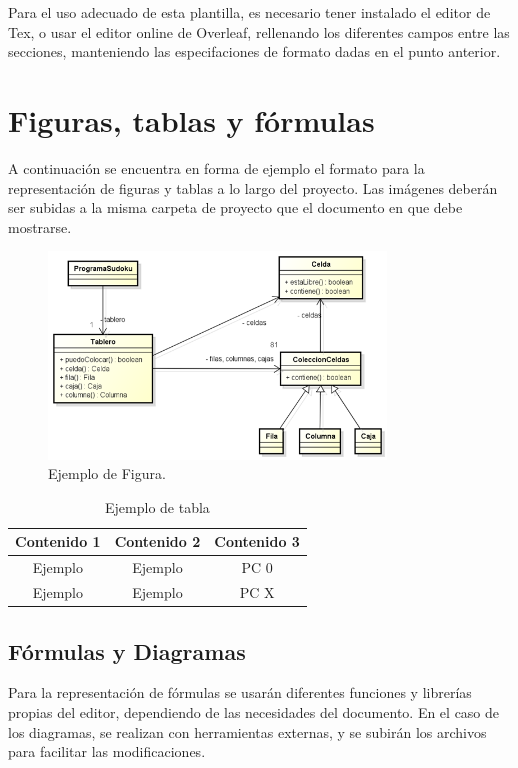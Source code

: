 \documentclass[titlepage,a4paper]{article}
\begin{document}
Para el uso adecuado de esta plantilla, es necesario tener instalado el editor de Tex, o usar el editor online de Overleaf, rellenando los diferentes campos entre las secciones, manteniendo las especifaciones de formato dadas en el punto anterior.

\section{Figuras, tablas y fórmulas }\label{sec:diagramasdeclase}

A continuación se encuentra en forma de ejemplo el formato para la representación de figuras y tablas a lo largo del proyecto. Las imágenes deberán ser subidas a la misma carpeta de proyecto que el documento en que debe mostrarse.

\begin{figure}[H]
\centering
\includegraphics[width=0.8\textwidth]{diagrama_clase01.png}
\caption{\label{fig:class01} Ejemplo de Figura.}
\end{figure}

\begin{table}[h]
\centering
\begin{tabular}{ | c | c | c | }
    \hline
    Contenido 1 & Contenido 2 & Contenido 3 \\ \hline
    Ejemplo & Ejemplo & PC 0 \\ \hline
    Ejemplo & Ejemplo & PC X \\ \hline
\end{tabular}
\caption{Ejemplo de tabla}
\end{table}

\subsection{Fórmulas y Diagramas}
Para la representación de fórmulas se usarán diferentes funciones y librerías propias del editor, dependiendo de las necesidades del documento. En el caso de los diagramas, se realizan con herramientas externas, y se subirán los archivos para facilitar las modificaciones.
\end{document}
